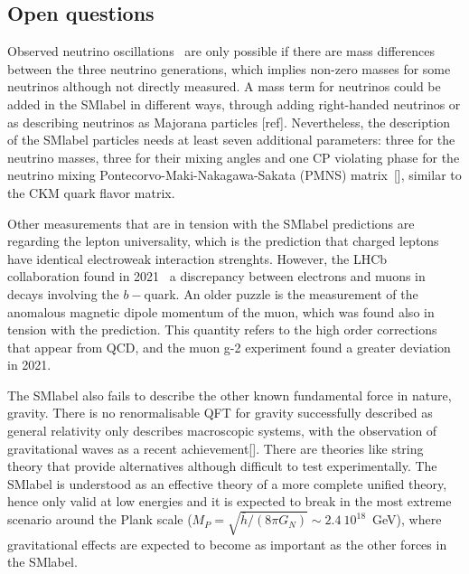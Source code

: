 \subsection{Open questions}
\label{subsec:openquestions}

Observed neutrino oscillations~\cite{neutrinoosc} are only possible if there are mass differences between the three neutrino generations, which implies non-zero masses for some neutrinos although not directly measured. A mass term for neutrinos could be added in the \acrshort{SMlabel} in different ways, through adding right-handed neutrinos or as describing neutrinos as Majorana particles [ref]. Nevertheless, the description of the \acrshort{SMlabel} particles needs at least seven additional parameters: three for the neutrino masses, three for their mixing angles and one CP violating phase for the neutrino mixing Pontecorvo-Maki-Nakagawa-Sakata (PMNS) matrix~[], similar to the CKM quark flavor matrix.

Other measurements that are in tension with the \acrshort{SMlabel} predictions are regarding the lepton universality, which is the prediction that charged leptons have identical electroweak interaction strenghts. However, the LHCb collaboration found in 2021~\cite{lhcbleptonviolation} a discrepancy between electrons and muons in decays involving the $b-$quark. An older puzzle is the measurement of the anomalous magnetic dipole momentum of the muon, which was found also in tension with the prediction. This quantity refers to the high order corrections that appear from \acrshort{QCD}, and the muon g-2 experiment found a greater deviation~\cite{PhysRevLett.126.141801} in 2021.

The \acrshort{SMlabel} also fails to describe the other known fundamental force in nature, gravity. There is no renormalisable \acrshort{QFT} for gravity successfully described as general relativity only describes macroscopic systems, with the observation of gravitational waves as a recent achievement[]. There are theories like string theory that provide alternatives although difficult to test experimentally. The \acrshort{SMlabel} is understood as an effective theory of a more complete unified theory, hence only valid at low energies and it is expected to break in the most extreme scenario around the Plank scale ($M_P=\sqrt{\bar{h}/(8\pi G_N)}\sim 2.4\ 10^{18}$~GeV), where gravitational effects are expected to become as important as the other forces in the \acrshort{SMlabel}. 

